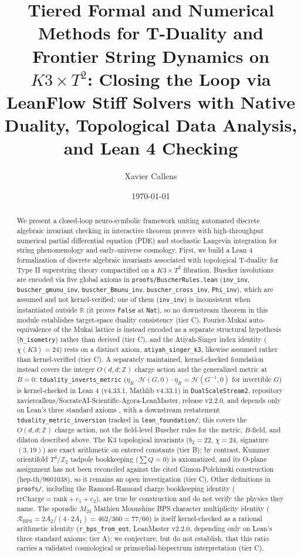 \documentclass[11pt,a4paper]{article}
\title{Tiered Formal and Numerical Methods for T-Duality and Frontier String Dynamics on $K3 \times T^2$: Closing the Loop via LeanFlow Stiff Solvers with Native Duality, Topological Data Analysis, and Lean 4 Checking}
\author[1]{Xavier Callens}
\affil[1]{SocrateAI Research, Independent Researcher}
\date{\today}
\begin{document}
\maketitle
\begin{abstract}
We present a closed-loop neuro-symbolic framework uniting automated discrete algebraic invariant checking in interactive theorem provers with high-throughput numerical partial differential equation (PDE) and stochastic Langevin integration for string phenomenology and early-universe cosmology. First, we build a Lean 4 formalization of discrete algebraic invariants associated with topological T-duality for Type II superstring theory compactified on a $K3 \times T^2$ fibration. Buscher involutions are encoded via five global axioms in \texttt{proofs/BuscherRules.lean} (\texttt{inv\_inv}, \texttt{buscher\_gmunu\_inv}, \texttt{buscher\_Bmunu\_inv}, \texttt{buscher\_cross\_inv}, \texttt{Phi\_inv}), which are assumed and not kernel-verified; one of them (\texttt{inv\_inv}) is inconsistent when instantiated outside $\mathbb{R}$ (it proves \texttt{False} at \texttt{Nat}), so no downstream theorem in this module establishes target-space duality consistency (tier C). Fourier-Mukai auto-equivalence of the Mukai lattice is instead encoded as a separate structural hypothesis (\texttt{h\_isometry}) rather than derived (tier C), and the Atiyah-Singer index identity ($\chi(K3) = 24$) rests on a distinct axiom, \texttt{atiyah\_singer\_k3}, likewise assumed rather than kernel-verified (tier C). A separately maintained, kernel-checked foundation instead covers the integer $O(d,d;\mathbb{Z})$ charge action and the generalized metric at $B=0$: \texttt{tduality\_inverts\_metric} ($\eta_R \cdot \mathcal{H}(G,0) \cdot \eta_R = \mathcal{H}(G^{-1},0)$ for invertible $G$) is kernel-checked in Lean 4 (v4.33.1, Mathlib v4.33.1) in \texttt{DualScaleStream2}, repository xaviercallens/SocrateAI-Scientific-Agora-LeanMaster, release v2.2.0, and depends only on Lean's three standard axioms \cite{leanmaster2026}, with a downstream restatement \texttt{tduality\_metric\_inversion} tracked in \texttt{lean\_foundation/}; this covers the $O(d,d;\mathbb{Z})$ charge action, not the field-level Buscher rules for the metric, $B$-field, and dilaton described above. The K3 topological invariants ($b_2 = 22$, $\chi = 24$, signature $(3,19)$) are exact arithmetic on entered constants (tier B); by contrast, Kummer orientifold $T^4/\mathbb{Z}_2$ tadpole bookkeeping ($\sum Q = 0$) is axiomatized, and its O-plane assignment has not been reconciled against the cited Gimon-Polchinski construction (hep-th/9601038), so it remains an open investigation (tier C). Other definitions in \texttt{proofs/}, including the Ramond-Ramond charge bookkeeping identity ($\mathrm{rrCharge} = \mathrm{rank} + c_1 + c_2$), are true by construction and do not verify the physics they name. The sporadic $M_{24}$ Mathieu Moonshine BPS character multiplicity identity ($\mathcal{R}_{\text{BPS}} = 2A_2/(4\cdot 2A_1) = 462/360 = 77/60$) is itself kernel-checked as a rational arithmetic identity (\texttt{r\_bps\_from\_eot}, LeanMaster v2.2.0, depending only on Lean's three standard axioms; tier A); we conjecture, but do not establish, that this ratio carries a validated cosmological or primordial-bispectrum interpretation (tier C).


\end{abstract}
\end{document}

